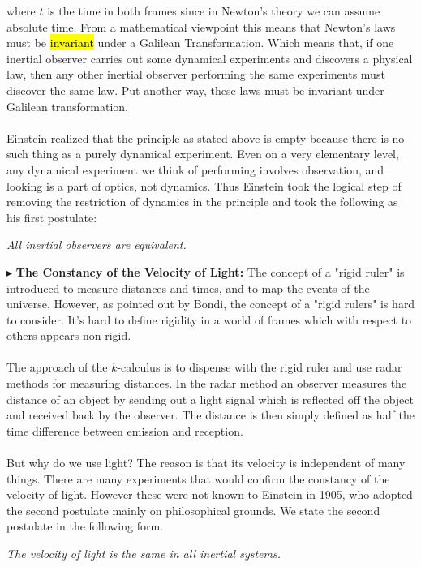 \documentclass[10pt,a4paper,twocolumn]{article}
\newcounter{theo}
\newcounter{def}
\newcommand{\hldb}[1]{%
    \sethlcolor{lightdelectricblue}%
    \hl{#1}%
}
\newcommand{\newpoint}[1]{\indent$\blacktriangleright$ \textbf{#1}}
\begin{document}
                \indent where $t$ is the time in both frames since in Newton's theory we can assume absolute time. From a mathematical viewpoint this means that Newton's laws must be \hldb{invariant} under a Galilean Transformation. Which means that, if one inertial observer carries out some dynamical experiments and discovers a physical law, then any other inertial observer performing the same experiments must discover the same law. Put another way, these laws must be invariant under Galilean transformation. 
                \\
                \\
                \indent Einstein realized that the principle as stated above is empty because there is no such thing as a purely dynamical experiment. Even on a very elementary level, any dynamical experiment we think of performing involves observation, and looking is a part of optics, not dynamics. Thus Einstein took the logical step of removing the restriction of dynamics in the principle and took the following as his first postulate:
                \begin{definition}\textit{
                    All inertial observers are equivalent.}
                \end{definition}
                \indent \newpoint{The Constancy of the Velocity of Light:} The concept of a "rigid ruler" is introduced to measure distances and times, and to map the events of the universe. However, as pointed out by Bondi, the concept of a "rigid rulers" is hard to consider. It's hard to define rigidity in a world of frames which with respect to others appears non-rigid. 
                \\
                \\
                \indent The approach of the $k$-calculus is to dispense with the rigid ruler and use radar methods for measuring distances. In the radar method an observer measures the distance of an object by sending out a light signal which is reflected off the object and received back by the observer. The distance is then simply defined as half the time difference between emission and reception. 
                \\
                \\
                \indent But why do we use light? The reason is that its velocity is independent of many things. There are many experiments that would confirm the constancy of the velocity of light. However these were not known to Einstein in 1905, who adopted the second postulate mainly on philosophical grounds. We state the second postulate in the following form.
                \begin{definition}
                    \textit{The velocity of light is the same in all inertial systems.}
                \end{definition}
                
\end{document}
